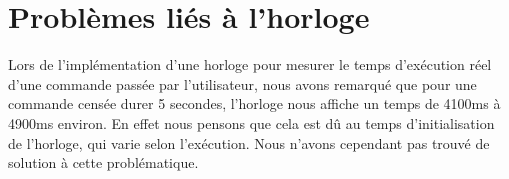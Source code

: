 \section{Problèmes liés à l'horloge}

    Lors de l'implémentation d'une horloge pour mesurer le temps d'exécution réel d'une commande passée par l'utilisateur, nous avons remarqué que pour une commande censée durer 5 secondes, l'horloge nous affiche un temps de 4100ms à 4900ms environ. En effet nous pensons que cela est dû au temps d'initialisation de l'horloge, qui varie selon l'exécution.
    Nous n'avons cependant pas trouvé de solution à cette problématique.
